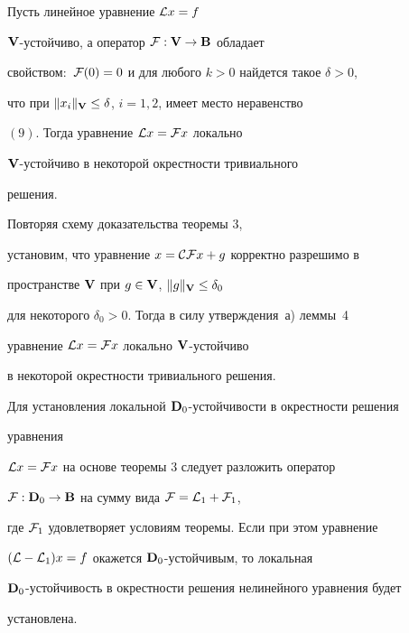 \begin{thm}


Пусть линейное уравнение ${\cal L}x=f$\;


$\bold {V}$-устойчиво, а оператор ${\cal F}:\bold {V}\to\bold {B}$ обладает


свойством$:$ ${\cal F}(0)=0$ и для любого $k>0$ найдется такое $\delta>0$,


что при $\|x_i\|_{\bold V}\le\delta$, $i=1,2$, имеет место неравенство


$(9)$. Тогда уравнение ${\cal L}x={\cal F}x$ локально


$\bold {V}$-устойчиво в некоторой окрестности тривиального


решения.


\end{thm}





\begin{pf}


Повторяя схему доказательства теоремы 3,


установим, что уравнение $x={\cal C}{\cal F}x+g$ корректно разрешимо в


пространстве $\bold {V}$ при $g\in\bold {V}$, $\|g\|_{\bold V}\le\delta_0$


для некоторого $\delta_0>0$. Тогда в силу утверждения~а) леммы~4


уравнение ${\cal L}x={\cal F}x$ локально $\bold {V}$-устойчиво


в некоторой окрестности тривиального решения.


\end{pf}





Для установления локальной $\bold {D}_0$-устойчивости в окрестности решения


уравнения


${\cal L}x={\cal F}x$ на основе теоремы 3 следует разложить оператор


${\cal F}:\bold {D}_0\to\bold {B}$ на сумму вида ${\cal F}={\cal L}_1+{\cal F}_1$,


где ${\cal F}_1$ удовлетворяет условиям теоремы. Если при этом уравнение


$({\cal L}-{\cal L}_1)x=f$ окажется $\bold {D}_0$-устойчивым, то локальная


$\bold {D}_0$-устойчивость в окрестности решения нелинейного уравнения будет


установлена.






